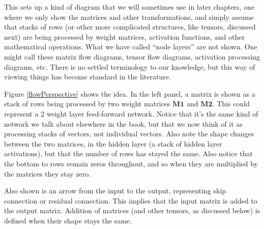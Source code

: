 This sets up a kind of diagram that we will sometimes use in later chapters, one where we only show the matrices and other transformations, and simply assume that stacks of rows (or other more complicated structures, like tensors, discussed next) are being processed by weight matrices, activation functions, and other mathematical operations. What we have called ``node layers'' are not shown.  One might call these matrix flow diagrams, tensor flow diagrams, activation processing diagrams, etc. There is no settled terminology to our knowledge, but this way of viewing things has become standard in the literature.

Figure \ref{flowPerspective} shows the idea. In the left panel, a matrix is shown as a stack of rows being processed by two weight matrices $\mathbf{M1}$ and $\mathbf{M2}$. This could represent a 2 weight layer feed-forward network. Notice that it's the same kind of network we talk about elsewhere in the book, but that we now think of it as processing stacks of vectors, not individual vectors. Also note the shape changes between the two matrices, in the hidden layer (a stack of hidden layer activations), but that the number of rows has stayed the same. Also notice that the bottom to rows remain zeros throughout, and so when they are multiplied by the matrices they stay zero. 

Also shown is an arrow from the input to the output, representing skip connection or residual connection. This implies that the input matrix is added to the output matrix. Addition of matrices (and other tensors, as discussed below) is defined when their shape stays the same. 


